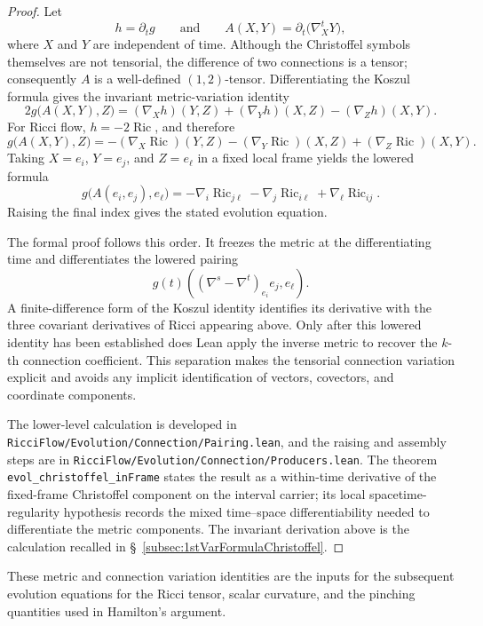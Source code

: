 \documentclass[11pt]{article}
\theoremstyle{plain}
\theoremstyle{definition}
\theoremstyle{remark}
\newcommand{\Ric}{\operatorname{Ric}}
\newcommand{\leanref}[1]{\nolinkurl{#1}}
\newcommand{\leanfile}[1]{\nolinkurl{#1}}
\newcommand{\rffile}[1]{\leanfile{#1}}
\begin{document}
\begin{proof}
Let
\[
  h=\partial_tg
  \qquad\text{and}\qquad
  A(X,Y)=\partial_t\bigl(\nabla^t_XY\bigr),
\]
where \(X\) and \(Y\) are independent of time.  Although the Christoffel symbols
themselves are not tensorial, the difference of two connections is a tensor;
consequently \(A\) is a well-defined \((1,2)\)-tensor.  Differentiating the
Koszul formula gives the invariant metric-variation identity
\[
  2g\bigl(A(X,Y),Z\bigr)
  =
  (\nabla_Xh)(Y,Z)
  +
  (\nabla_Yh)(X,Z)
  -
  (\nabla_Zh)(X,Y).
\]
For Ricci flow, \(h=-2\Ric\), and therefore
\[
  g\bigl(A(X,Y),Z\bigr)
  =
  -(\nabla_X\Ric)(Y,Z)
  -(\nabla_Y\Ric)(X,Z)
  +(\nabla_Z\Ric)(X,Y).
\]
Taking \(X=e_i\), \(Y=e_j\), and \(Z=e_\ell\) in a fixed local frame yields the
lowered formula
\[
  g\bigl(A(e_i,e_j),e_\ell\bigr)
  =
  -\nabla_i\Ric_{j\ell}
  -\nabla_j\Ric_{i\ell}
  +\nabla_\ell\Ric_{ij}.
\]
Raising the final index gives the stated evolution equation.

The formal proof follows this order.  It freezes the metric at the
differentiating time and differentiates the lowered pairing
\[
  g(t)\!\left(
    (\nabla^s-\nabla^t)_{e_i}e_j,e_\ell
  \right).
\]
A finite-difference form of the Koszul identity identifies its derivative with
the three covariant derivatives of Ricci appearing above.  Only after this
lowered identity has been established does Lean apply the inverse metric to
recover the \(k\)-th connection coefficient.  This separation makes the
tensorial connection variation explicit and avoids any implicit identification
of vectors, covectors, and coordinate components.

The lower-level calculation is developed in
\rffile{RicciFlow/Evolution/Connection/Pairing.lean}, and the raising and
assembly steps are in \rffile{RicciFlow/Evolution/Connection/Producers.lean}.
The theorem \leanref{evol_christoffel_inFrame} states the result as a
within-time derivative of the fixed-frame Christoffel component on the interval
carrier; its local spacetime-regularity hypothesis records the mixed
time--space differentiability needed to differentiate the metric components.
The invariant derivation above is the calculation recalled in
\S~\ref{subsec:1stVarFormulaChristoffel}.
\end{proof}

These metric and connection variation identities are the inputs for the
subsequent evolution equations for the Ricci tensor, scalar curvature, and the
pinching quantities used in Hamilton's argument.
\end{document}
